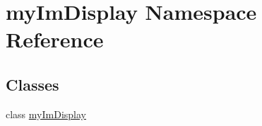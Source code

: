 \hypertarget{namespacemy_im_display}{\section{my\-Im\-Display Namespace Reference}
\label{namespacemy_im_display}
}
\subsection*{Classes}
\begin{DoxyCompactItemize}
\item 
class \hyperlink{classmy_im_display_1_1my_im_display}{my\-Im\-Display}
\end{DoxyCompactItemize}
